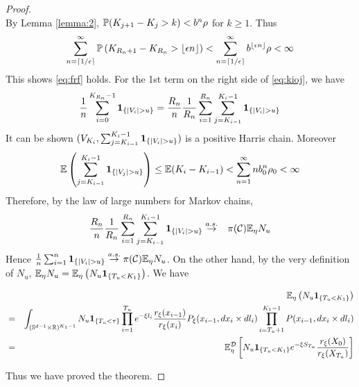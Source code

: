 \begin{proof}
\[  \]
  By Lemma \ref{lemma:2}, $\P(K_{j + 1} - K_j > k) < b^n \rho$ for $k \geq 1$.
  Thus
  \[
    \sum_{n=\ceil{1/\epsilon}}^\infty \P\left(
    {K_{R_n + 1} - K_{R_n}} > \floor{\epsilon n}
  \right)
  <
  \sum_{n=\ceil{1/\epsilon}}^\infty b^{\floor{\epsilon n}} \rho < \infty
  \]
  This shows \eqref{eq:frf} holds.
  For the 1st term on the right side of \eqref{eq:kioj}, we have
  \[
  {1 \over n} \sum_{i=0}^{K_{R_n}-1} \1{|V_i| > u}
    =
    {R_n \over n} {1 \over R_n} \sum_{i=1}^{R_n}
    \sum_{j=K_{i-1}}^{K_i-1}\1{|V_i| > u}
  \]
  It can be shown $(V_{K_i}, \sum_{j=K_{i-1}}^{K_i-1}\1{|V_i| > u})$
  is a positive Harris chain. Moreover
  \[
  \E \left(
    \sum_{j=K_{i-1}}^{K_i-1}\1{|V_j| > u}
  \right)
  \leq
  \E (K_i - K_{i-1}) < \sum_{n=1}^\infty n b_0^n \rho_0 < \infty
  \]
  Therefore, by the law of large numbers for Markov chains,
  \begin{eqnarray*}
    {R_n \over n} {1 \over R_n} \sum_{i=1}^{R_n}
    \sum_{j=K_{i-1}}^{K_i-1}\1{|V_i| > u}
    &\overset{a.s.}{\to}& \pi(\mathcal C) \E_\eta N_u
  \end{eqnarray*}
  Hence
  ${1 \over n} \sum_{i=1}^n \1{|V_i| > u} \overset{a.s.}{\to} \pi(\mathcal C) \E_\eta N_u$.
  On the other hand, by the very definition of $N_u$,
  $\E_\eta N_u = \E_\eta \left( N_u \1{T_u < K_1}\right)$. We have
  \begin{small}
    \begin{eqnarray*}
      && \E_\eta \left( N_u \1{T_u < K_1}\right) \\
      &=&
      \int_{(\sphere^{d-1} \times \reals)^{K_1 - 1}}
      N_u \1{T_u < \tau}
      \prod_{i=1}^{T_u} e^{-\xi l_i}
      {r_\xi(x_{i-1}) \over r_\xi(x_{i})}P_\xi(x_{i-1}, dx_i \times dl_i)
      \prod_{i=T_u+1}^{K_1 - 1} P(x_{i-1}, dx_i \times d l_i) \\
      &=&
      \E^{\mathcal D}_\eta
      \left[
        N_u \1{T_u < K_1} e^{-\xi S_{T_u}}
        {r_\xi(X_0)
          \over
          r_\xi(X_{T_u})
        }
      \right]
    \end{eqnarray*}
  \end{small}
  Thus we have proved the theorem.
\end{proof}

